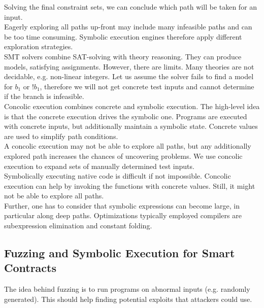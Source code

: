 Solving the final constraint sets, we can conclude which path will be taken for an input. \\

Eagerly exploring all paths up-front may include many infeasible paths and can be too time consuming. Symbolic execution engines therefore apply different exploration strategies. \\

SMT solvers combine SAT-solving with theory reasoning. They can produce models, satisfying assignments. However, there are limits. Many theories are not decidable, e.g. non-linear integers. Let us assume the solver fails to find a model for $b_1$ or $!b_1$, therefore we will not get concrete test inputs and cannot determine if the branch is infeasible. \\

Concolic execution combines concrete and symbolic execution. The high-level idea is that the concrete execution drives the symbolic one. Programs are executed with concrete inputs, but additionally maintain a symbolic state. Concrete values are used to simplify path conditions. \\

A concolic execution may not be able to explore all paths, but any additionally explored path increases the chances of uncovering problems. We use concolic execution to expand sets of manually determined test inputs. \\

Symbolically executing native code is difficult if not impossible. Concolic execution can help by invoking the functions with concrete values. Still, it might not be able to explore all paths. \\

Further, one has to consider that symbolic expressions can become large, in particular along deep paths. Optimizations typically employed compilers are subexpression elimination and constant folding.


\subsection{Fuzzing and Symbolic Execution for Smart Contracts}

The idea behind fuzzing is to run programs on abnormal inputs (e.g. randomly generated). This should help finding potential exploits that attackers could use. \\

